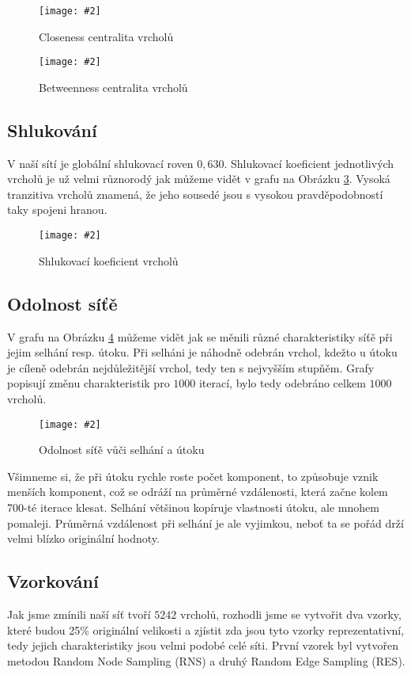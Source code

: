 \documentclass[a4paper,12pt]{article}
\newcommand{\image}[4]{\begin{figure}[h!] \centering \texttt{[image: \#2]} \caption{#4} \label{#3} \end{figure}}
\begin{document}
\image{0.7}{../grafy/closeness.pdf}{fig:closeness}{Closeness centralita vrcholů}
\image{0.7}{../grafy/betweenness.pdf}{fig:betweenness}{Betweenness centralita vrcholů}

\FloatBarrier
\newpage
\subsection{Shlukování}
V naší sítí je globální shlukovací roven $0,630$. Shlukovací koeficient jednotlivých vrcholů je už 
velmi různorodý jak můžeme vidět v grafu na Obrázku \ref{fig:cluster}. Vysoká tranzitiva vrcholů znamená, že jeho sousedé jsou s vysokou pravděpodobností taky spojeni
hranou.

\image{0.7}{../grafy/shlukovaci_koef.pdf}{fig:cluster}{Shlukovací koeficient vrcholů}
\FloatBarrier
\newpage
\subsection{Odolnost síťě}
V grafu na Obrázku \ref{fig:failAttack} můžeme vidět jak se měnili různé charakteristiky síťě při jejim selhání resp. útoku.
Při selháni je náhodně odebrán vrchol, kdežto u útoku je cíleně odebrán nejdůležitější vrchol, tedy ten s nejvyšším stupňěm. Grafy popisují změnu
charakteristik pro $1000$ iterací, bylo tedy odebráno celkem $1000$ vrcholů.

\image{1}{../grafy/failureAttack1000.pdf}{fig:failAttack}{Odolnost síťě vůči selhání a útoku}

Všimneme si, že při útoku rychle roste počet komponent, to způsobuje vznik menších komponent, což se odráží na průměrné vzdálenosti, která začne kolem 700-té iterace
klesat. Selhání většinou kopíruje vlastnosti útoku, ale mnohem pomaleji. Průměrná vzdálenost při selhání je ale vyjimkou, neboť ta se pořád drží velmi 
blízko originální hodnoty.
\FloatBarrier
\newpage
\subsection{Vzorkování}
Jak jsme zmínili naší síť tvoří $5242$ vrcholů, rozhodli jsme se vytvořit dva vzorky, které budou 25\% originální velikosti a zjístit zda jsou tyto vzorky
reprezentativní, tedy jejich charakteristiky jsou velmi podobé celé síti. První vzorek byl vytvořen metodou Random Node Sampling (RNS) a druhý Random Edge Sampling (RES).
\end{document}
